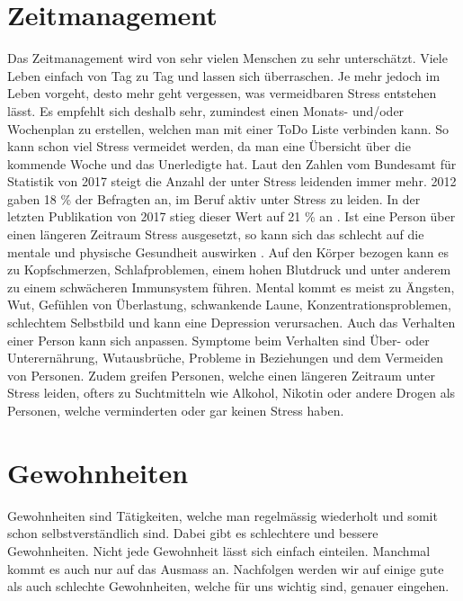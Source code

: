 \section{Zeitmanagement}
\authortoc{\jonas}{\sectionident}
Das Zeitmanagement wird von sehr vielen Menschen zu sehr unterschätzt. Viele Leben einfach von Tag zu Tag und lassen sich überraschen. Je mehr jedoch im Leben vorgeht, desto mehr geht vergessen, was vermeidbaren Stress entstehen lässt. 
\newline
Es empfehlt sich deshalb sehr, zumindest einen Monats- und/oder Wochenplan zu erstellen, welchen man mit einer ToDo Liste verbinden kann. So kann schon viel Stress vermeidet werden, da man eine Übersicht über die kommende Woche und das Unerledigte hat. 
\newline
Laut den Zahlen vom Bundesamt für Statistik von 2017 steigt die Anzahl der unter Stress leidenden immer mehr. 2012 gaben 18 \% der Befragten an, im Beruf aktiv unter Stress zu leiden. In der letzten Publikation von 2017 stieg dieser Wert auf 21 \% an \cite{bundesamtfrstatistik_2019_arbeitsbedingungen}. Ist eine Person über einen längeren Zeitraum Stress ausgesetzt, so kann sich das schlecht auf die mentale und physische Gesundheit auswirken \cite{stress-symptoms}. Auf den Körper bezogen kann es zu Kopfschmerzen, Schlafproblemen, einem hohen Blutdruck und unter anderem zu einem schwächeren Immunsystem führen. Mental kommt es meist zu Ängsten, Wut, Gefühlen von Überlastung, schwankende Laune, Konzentrationsproblemen, schlechtem Selbstbild und kann eine Depression verursachen. Auch das Verhalten einer Person kann sich anpassen. Symptome beim Verhalten sind Über- oder Unterernährung, Wutausbrüche, Probleme in Beziehungen und dem Vermeiden von Personen. Zudem greifen Personen, welche einen längeren Zeitraum unter Stress leiden, ofters zu Suchtmitteln wie Alkohol, Nikotin oder andere Drogen als Personen, welche verminderten oder gar keinen Stress haben.
\section{Gewohnheiten}
\authortoc{\dario}{\sectionident}
Gewohnheiten sind Tätigkeiten, welche man regelmässig wiederholt und somit schon selbstverständlich sind. Dabei gibt es schlechtere und bessere Gewohnheiten.
\newline
Nicht jede Gewohnheit lässt sich einfach einteilen. Manchmal kommt es auch nur auf das Ausmass an.
\newline
Nachfolgen werden wir auf einige gute als auch schlechte Gewohnheiten, welche für uns wichtig sind, genauer eingehen. 
\newline
